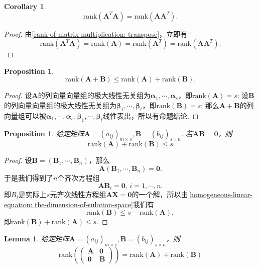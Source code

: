 \documentclass{article}
\newtheorem{lemma}[theorem]{Lemma}
\newtheorem{corollary}[theorem]{Corollary}
\newtheorem{proposition}[theorem]{Proposition}
\newcommand{\mbf}[1]{\bm{#1}}
\newcommand{\rank}[1]{\text{rank}\left(#1\right)} %
\begin{document}
\begin{corollary}
\rm 
$$
\rank{\mbf{A}^T\mbf{A}} = \rank{\mbf{A}\mbf{A}^T}.
$$
\end{corollary}

\begin{proof}
由\ref{rank-of-matrix-multiplication: transpose}，立即有
$$
\rank{\mbf{A}^T\mbf{A}} = \rank{\mbf{A}} = \rank{\mbf{A}^T} = \rank{\mbf{A}\mbf{A}^T}. 
$$
\end{proof}

\begin{proposition}
\rm 
$$
\rank{\mbf{A}+\mbf{B}} \leq \rank{\mbf{A}}+\rank{\mbf{B}}.
$$
\end{proposition}

\begin{proof}
\rm 设$\mbf{A}$的列向量向量组的极大线性无关组为$\mbf{\alpha}_1,\cdots,\mbf{\alpha}_s$，即$\rank{\mbf{A}}=s$; 设$\mbf{B}$的列向量向量组的极大线性无关组为$\mbf{\beta}_1,\cdots,\mbf{\beta}_t$，即$\rank{\mbf{B}}=s$; 那么$\mbf{A}+\mbf{B}$的列向量组可以被$\mbf{\alpha}_1,\cdots,\mbf{\alpha}_s, \mbf{\beta}_1,\cdots,\mbf{\beta}_t$线性表出，所以有命题结论. 
\end{proof}



\begin{proposition}
\rm 给定矩阵$\mbf{A}=(a_{ij})_{m \times s},\mbf{B}=(b_{ij})_{s \times n}$. 若$\mbf{A}\mbf{B}=\mbf{0}$，则
$$
\rank{\mbf{A}} + \rank{\mbf{B}} \leq s
$$
\end{proposition}

\begin{proof}
\rm 设$\mbf{B} =(\mbf{B}_1,\cdots,\mbf{B}_n)$，那么
$$
\mbf{A}(\mbf{B}_1,\cdots,\mbf{B}_n)=\mbf{0}.
$$
于是我们得到了$n$个齐次方程组
$$
\mbf{A}\mbf{B}_i = \mbf{0},\, i = 1,\cdots,n.
$$
即$B_i$是实际上$s$元齐次线性方程组$\mbf{A}\mbf{X}=\mbf{0}$的一个解，所以由\ref{homogeneous-linear-equation: the-dimension-of-sulotion-space}我们有
$$
\rank{\mbf{B}} \leq s-\rank{\mbf{A}},
$$
即$\rank{\mbf{B}} + \rank{\mbf{A}} \leq s$.
\end{proof}

\begin{lemma}\label{matrix-rank: special1}
\rm 给定矩阵$\mbf{A}=(a_{ij})_{m \times s},\mbf{B}=(b_{ij})_{s \times n}$，则
$$
\rank{\begin{pmatrix}
\mbf{A} & \mbf{0} \\
\mbf{0}	& \mbf{B} 
\end{pmatrix}} = \rank{\mbf{A}}+\rank{\mbf{B}}
$$
\end{lemma}
\end{document}
